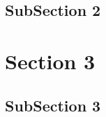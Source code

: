 \begin{problem}
    \lipsum[1]\newline
    \begin{solution}
        \lipsum[1]
    \end{solution}
\end{problem}

\subsection{SubSection 2}
\lipsum[1]

\section{Section 3}
\begin{theorem}
    \lipsum[1]
\end{theorem}

\begin{definition}
    \lipsum[1]
\end{definition}

\begin{note}
    \lipsum[1]
\end{note}

\begin{example}
    \lipsum[1]
\end{example}

\begin{problem}
    \lipsum[1]\newline
    \begin{solution}
        \lipsum[1]
    \end{solution}
\end{problem}

\subsection{SubSection 3}
\lipsum[1]
